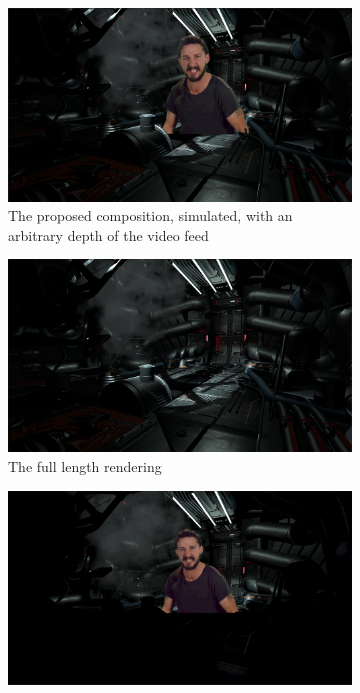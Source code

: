 \begin{figure}[htbp]
	\caption{A comparison of different composition methods in engine}
	\label{fig:zsort:comparison}
	\begin{subfigure}[t]{.45\textwidth}
		\centering
		\includegraphics[width=\textwidth]{_raw_resources/composition/Composition-Perfect-Realigned.png}
		\caption{The proposed composition, simulated, with an arbitrary depth 
		of the video feed}
	\end{subfigure}
	\begin{subfigure}[t]{.45\textwidth}
		\centering
		\includegraphics[width=\textwidth]{_raw_resources/composition/Composition-Full-Render.png}
		\caption{The full length rendering}
	\end{subfigure}
	\newline
	\begin{subfigure}[t]{.45\textwidth}
		\centering
		\includegraphics[width=\textwidth]{_raw_resources/composition/Composition-Front-Replace_orso.png}

\end{subfigure}
\end{figure}
